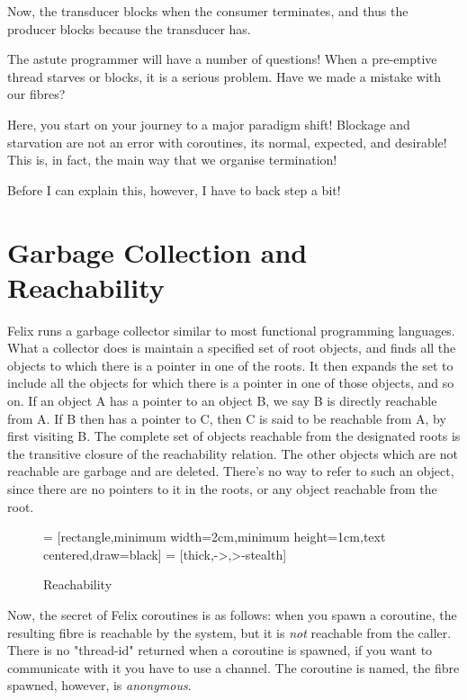 \documentclass[oneside]{book}
\begin{document}
Now, the transducer blocks when the consumer terminates, and thus
the producer blocks because the transducer has.

The astute programmer will have a number of questions!
When a pre-emptive thread starves or blocks, it is a serious
problem. Have we made a mistake with our fibres?

Here, you start on your journey to a major paradigm shift!
Blockage and starvation are not an error with coroutines,
its normal, expected, and desirable! This is, in fact,
the main way that we organise termination!

Before I can explain this, however, I have to back step a bit!

\section{Garbage Collection and Reachability}
Felix runs a garbage collector similar to most functional programming
languages. What a collector does is maintain a specified set of root
objects, and finds all the objects to which there is a pointer
in one of the roots. It then expands the set to include all the objects
for which there is a pointer in one of those objects, and so on.
If an object A has a pointer to an object B, we say B is directly
reachable from A. If B then has a pointer to C, then C is said to be
reachable from A, by first visiting B. The complete set of objects
reachable from the designated roots is the transitive closure of the
reachability relation. The other objects which are not reachable
are garbage and are deleted. There's no way to refer to such an object,
since there are no pointers to it in the roots, or any object reachable
from the root.

\begin{figure}[h]
\begin{center}
 = [rectangle,minimum width=2cm,minimum height=1cm,text centered,draw=black]
 = [thick,->,>-stealth]
\caption{Reachability}
\end{center}
\end{figure}

Now, the secret of Felix coroutines is as follows: when you spawn
a coroutine, the resulting fibre is reachable by the system,
but it is {\em not} reachable from the caller. There is no "thread-id"
returned when a coroutine is spawned, if you want to communicate
with it you have to use a channel. The coroutine is named, the 
fibre spawned, however, is {\em anonymous}.
\end{document}

